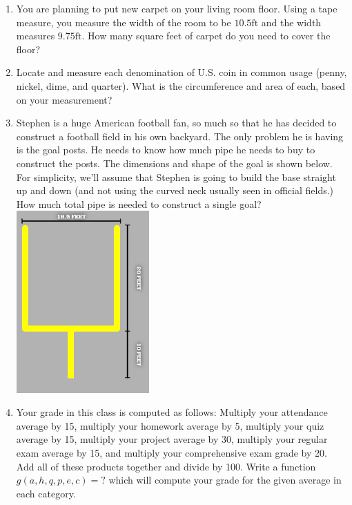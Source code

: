 \documentclass{article}
\begin{document}
\begin{enumerate}
\item You are planning to put new carpet on your living room floor.  Using a tape measure, you measure the width of the room to be $10.5\mathrm{ft}$ and the width measures $9.75\mathrm{ft}$.  How many square feet of carpet do you need to cover the floor?

\item Locate and measure each denomination of U.S. coin in common usage (penny, nickel, dime, and quarter).  What is the circumference and area of each, based on your measurement?

\item Stephen is a huge American football fan, so much so that he has decided to construct a football field in his own backyard.  The only problem he is having is the goal posts.  He needs to know how much pipe he needs to buy to construct the posts.  The dimensions and shape
of the goal is shown below.  For simplicity, we'll assume that Stephen is going to build the base straight up and down (and not using the curved neck usually seen in official fields.)
How much total pipe is needed to construct a single goal?\newline
\includegraphics[width=2in]{images/football-goal}

\item Your grade in this class is computed as follows: Multiply your attendance average by 15, multiply your homework average by 5, multiply your quiz average by 15, multiply your project average by 30, multiply your regular exam average by 15, and multiply your comprehensive exam grade by 20.  Add all of these products together and divide by 100.  Write a function $g(a,h,q,p,e,c)=?$ which will compute your grade for the given average in each category.

\end{enumerate}
\end{document}
